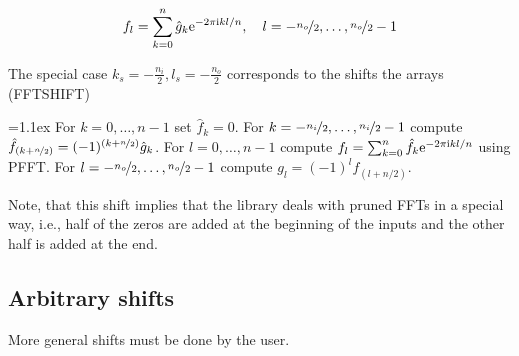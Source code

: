 \begin{equation*}
  f_l = \sum_{k=0}^n \hat g_k \mathrm{e}^{-2\pi{\ensuremath{\text{\scriptsize{i}}}} kl/n}, \quad l=-\nicefrac{n_o}{2},\hdots,\nicefrac{n_o}{2}-1  
\end{equation*}

The special case $k_s=-\frac{n_i}{2}, l_s=-\frac{n_o}{2}$ corresponds to the shifts the arrays (\textsf{FFTSHIFT})
\begin{algorithm}
  \begin{algorithmic}[1]
    \itemsep=1.1ex
    \State For $k=0,\hdots,n-1$ set $\hat f_k = 0$.
    \State For $k=-\nicefrac{n_i}{2},\hdots,\nicefrac{n_i}{2}-1$ compute $\hat f_{(k+\nicefrac{n}{2})} = (-1)^{(k+\nicefrac{n}{2})} \hat g_{k}$.
    \State For $l=0,\hdots,n-1$ compute $f_l = \sum_{k=0}^{n} \hat f_k \mathrm{e}^{-2\pi{\ensuremath{\text{\scriptsize{i}}}} kl/n}$ using PFFT.
    \State For $l=-\nicefrac{n_o}{2},\hdots,\nicefrac{n_o}{2}-1$ compute $g_l = (-1)^l f_{(l+n/2)} $.
  \end{algorithmic}
\end{algorithm}


Note, that this shift implies that the library deals with pruned FFTs in a special way, i.e., half of the zeros are added
at the beginning of the inputs and the other half is added at the end.






\subsection{Arbitrary shifts}
More general shifts must be done by the user.


